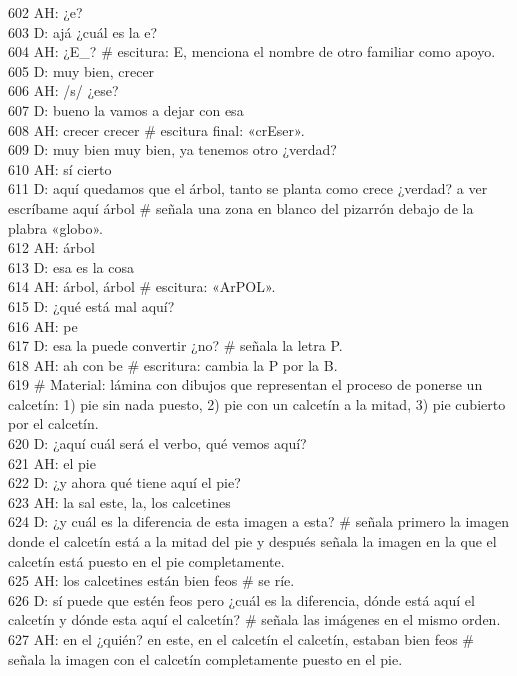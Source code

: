 602 AH: ¿e?\\
603 D: ajá ¿cuál es la e?\\
604 AH: ¿E\_? \# escitura: E, menciona el nombre de otro familiar como apoyo.\\
605 D: muy bien, crecer\\
606 AH: /s/ ¿ese?\\
607 D: bueno la vamos a dejar con esa\\
608 AH: crecer crecer \# escitura final: «crEser».\\
609 D: muy bien muy bien, ya tenemos otro ¿verdad?\\
610 AH: sí cierto\\
611 D: aquí quedamos que el árbol, tanto se planta como crece ¿verdad? a ver escríbame aquí árbol \# señala una zona en blanco del pizarrón debajo de la plabra «globo».\\
612 AH: árbol\\
613 D: esa es la cosa\\
614 AH: árbol, árbol \# escitura: «ArPOL».\\
615 D: ¿qué está mal aquí?\\
616 AH: pe\\
617 D: esa la puede convertir ¿no? \# señala la letra P.\\
618 AH: ah con be \# escritura: cambia la P por la B.\\
619 \# Material: lámina con dibujos que representan el proceso de ponerse un calcetín: 1) pie sin nada puesto, 2) pie con un calcetín a la mitad, 3) pie cubierto por el calcetín.\\
620 D: ¿aquí cuál será el verbo, qué vemos aquí?\\
621 AH: el pie\\
622 D: ¿y ahora qué tiene aquí el pie?\\
623 AH: la sal este, la, los calcetines\\
624 D: ¿y cuál es la diferencia de esta imagen a esta? \# señala primero la imagen donde el calcetín está a la mitad del pie y después señala la imagen en la que el calcetín está puesto en el pie completamente.\\
625 AH: los calcetines están bien feos \# se ríe.\\
626 D: sí puede que estén feos pero ¿cuál es la diferencia, dónde está aquí el calcetín y dónde esta aquí el calcetín? \# señala las imágenes en el mismo orden.\\
627 AH: en el ¿quién? en este, en el calcetín el calcetín, estaban bien feos \# señala la imagen con el calcetín completamente puesto en el pie.\\
